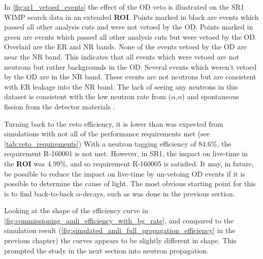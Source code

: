 
%



\par
In \autoref{fig:sr1_vetoed_events} the effect of the OD veto is illustrated on the SR1 WIMP search data in an extended \textbf{ROI}.
Points marked in black are events which passed all other analysis cuts and were not vetoed by the OD.
Points marked in green are events which passed all other analysis cuts but were vetoed by the OD.
Overlaid are the ER and NR bands.
None of the events vetoed by the OD are near the NR band.
This indicates that all events which were vetoed are not neutrons but rather backgrounds in the OD.
Several events which weren't vetoed by the OD are in the NR band.
These events are not neutrons but are consistent with ER leakage into the NR band.
The lack of seeing any neutrons in this dataset is consistent with the low neutron rate from ($\alpha$,$n$) and spontaneous fission from the detector materials \cite{LZ_TechnicalDesignReview_ref}.



\par
Turning back to the veto efficiency, it is lower than was expected from simulations with not all of the performance requirements met (see \autoref{tab:veto_requirements})
With a neutron tagging efficiency of 84.6\%, the requirement R-160001 is not met.
However, in SR1, the impact on live-time in the \textbf{ROI} was 4.99\%, and so requirement R-160005 is satisfied.
It may, in future, be possible to reduce the impact on live-time by un-vetoing OD events if it is possible to determine the cause of light.
The most obvious starting point for this is to find back-to-back $\alpha$-decays, such as was done in the previous section.

\par
Looking at the shape of the efficiency curve in \autoref{fig:commissioning_amli_efficiency_with_bg_rate}, and compared to the simulation result (\autoref{fig:simulated_amli_full_propagation_efficiency} in the previous chapter) the curves appears to be slightly different in shape.
This prompted the study in the next section into neutron propagation.

